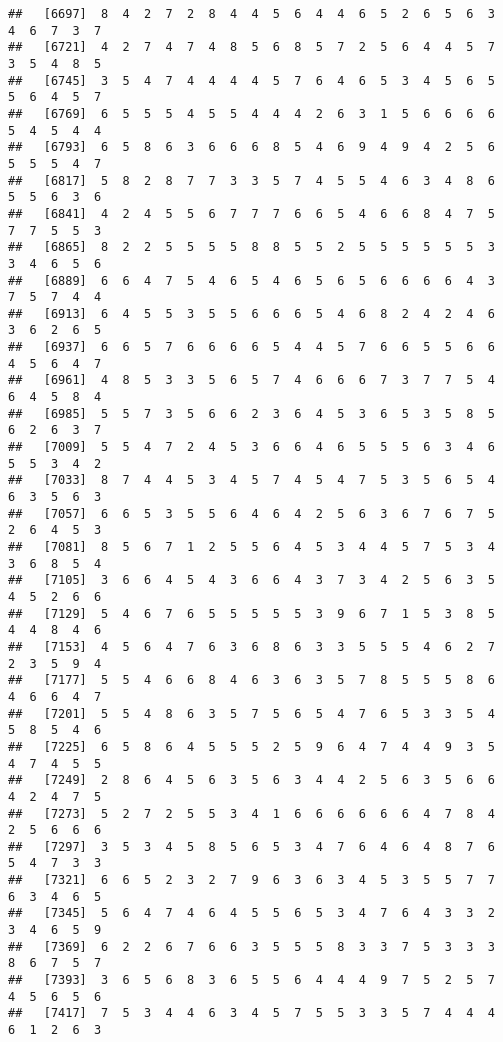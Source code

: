\documentclass[
]{book}
\begin{document}
\begin{verbatim}
##   [6697]  8  4  2  7  2  8  4  4  5  6  4  4  6  5  2  6  5  6  3  4  6  7  3  7
##   [6721]  4  2  7  4  7  4  8  5  6  8  5  7  2  5  6  4  4  5  7  3  5  4  8  5
##   [6745]  3  5  4  7  4  4  4  4  5  7  6  4  6  5  3  4  5  6  5  5  6  4  5  7
##   [6769]  6  5  5  5  4  5  5  4  4  4  2  6  3  1  5  6  6  6  6  5  4  5  4  4
##   [6793]  6  5  8  6  3  6  6  6  8  5  4  6  9  4  9  4  2  5  6  5  5  5  4  7
##   [6817]  5  8  2  8  7  7  3  3  5  7  4  5  5  4  6  3  4  8  6  5  5  6  3  6
##   [6841]  4  2  4  5  5  6  7  7  7  6  6  5  4  6  6  8  4  7  5  7  7  5  5  3
##   [6865]  8  2  2  5  5  5  5  8  8  5  5  2  5  5  5  5  5  5  3  3  4  6  5  6
##   [6889]  6  6  4  7  5  4  6  5  4  6  5  6  5  6  6  6  6  4  3  7  5  7  4  4
##   [6913]  6  4  5  5  3  5  5  6  6  6  5  4  6  8  2  4  2  4  6  3  6  2  6  5
##   [6937]  6  6  5  7  6  6  6  6  5  4  4  5  7  6  6  5  5  6  6  4  5  6  4  7
##   [6961]  4  8  5  3  3  5  6  5  7  4  6  6  6  7  3  7  7  5  4  6  4  5  8  4
##   [6985]  5  5  7  3  5  6  6  2  3  6  4  5  3  6  5  3  5  8  5  6  2  6  3  7
##   [7009]  5  5  4  7  2  4  5  3  6  6  4  6  5  5  5  6  3  4  6  5  5  3  4  2
##   [7033]  8  7  4  4  5  3  4  5  7  4  5  4  7  5  3  5  6  5  4  6  3  5  6  3
##   [7057]  6  6  5  3  5  5  6  4  6  4  2  5  6  3  6  7  6  7  5  2  6  4  5  3
##   [7081]  8  5  6  7  1  2  5  5  6  4  5  3  4  4  5  7  5  3  4  3  6  8  5  4
##   [7105]  3  6  6  4  5  4  3  6  6  4  3  7  3  4  2  5  6  3  5  4  5  2  6  6
##   [7129]  5  4  6  7  6  5  5  5  5  5  3  9  6  7  1  5  3  8  5  4  4  8  4  6
##   [7153]  4  5  6  4  7  6  3  6  8  6  3  3  5  5  5  4  6  2  7  2  3  5  9  4
##   [7177]  5  5  4  6  6  8  4  6  3  6  3  5  7  8  5  5  5  8  6  4  6  6  4  7
##   [7201]  5  5  4  8  6  3  5  7  5  6  5  4  7  6  5  3  3  5  4  5  8  5  4  6
##   [7225]  6  5  8  6  4  5  5  5  2  5  9  6  4  7  4  4  9  3  5  4  7  4  5  5
##   [7249]  2  8  6  4  5  6  3  5  6  3  4  4  2  5  6  3  5  6  6  4  2  4  7  5
##   [7273]  5  2  7  2  5  5  3  4  1  6  6  6  6  6  6  4  7  8  4  2  5  6  6  6
##   [7297]  3  5  3  4  5  8  5  6  5  3  4  7  6  4  6  4  8  7  6  5  4  7  3  3
##   [7321]  6  6  5  2  3  2  7  9  6  3  6  3  4  5  3  5  5  7  7  6  3  4  6  5
##   [7345]  5  6  4  7  4  6  4  5  5  6  5  3  4  7  6  4  3  3  2  3  4  6  5  9
##   [7369]  6  2  2  6  7  6  6  3  5  5  5  8  3  3  7  5  3  3  3  8  6  7  5  7
##   [7393]  3  6  5  6  8  3  6  5  5  6  4  4  4  9  7  5  2  5  7  4  5  6  5  6
##   [7417]  7  5  3  4  4  6  3  4  5  7  5  5  3  3  5  7  4  4  4  6  1  2  6  3

\end{verbatim}
\end{document}

